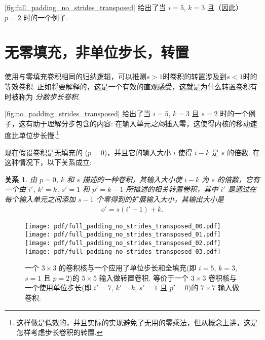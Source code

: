 \documentclass[notitlepage]{ctexrep}
\newtheorem{relationship}{关系}
\begin{document}
\autoref{fig:full_padding_no_strides_transposed} 给出了当 $i =
5$, $k = 3$ 且（因此） $p = 2$ 时的一个例子.

\section{无零填充，非单位步长，转置}

使用与零填充卷积相同的归纳逻辑，可以推测$s>1$时卷积的转置涉及到$s<1$时的等效卷积. 
正如将要解释的，这是一个有效的直观感受，这就是为什么转置卷积有时被称为 {\em
分数步长卷积}.

\autoref{fig:no_padding_strides_transposed} 给出了当 $i = 5$, $k
= 3$ 且 $s = 2$ 时的一个例子，这有助于理解分步包含的内容: 在输入单元{\em 之间\/}插入零，这使得内核的移动速度比单位步长慢.\footnote{这样做是低效的，并且实际的实现避免了无用的零乘法，但从概念上讲，这是怎样考虑步长卷积的转置.}

现在假设卷积是无填充的 ($p = 0$)，并且它的输入大小 $i$ 使得 $i - k$ 是 $s$ 的倍数. 在这种情况下，以下关系成立:

\begin{relationship}\label{rel:no_padding_strides_transposed}
由 $p = 0$, $k$ 和 $s$ 描述的一种卷积，其输入大小使 $i - k$ 为 $s$ 的倍数，它有一个由 $\tilde{i}'$, $k' = k$, $s' = 1$ 和 $p' = k - 1$ 所描述的相关转置卷积，其中 $\tilde{i}'$ 是通过在每个输入单元之间添加 $s - 1$ 个零得到的扩展输入大小，其输出大小是
\begin{equation*}
\begin{split}
    o' = s (i' - 1) + k.
\end{split}
\end{equation*}
\end{relationship}

\begin{figure}[p]
    \centering
    \texttt{[image: pdf/full\_padding\_no\_strides\_transposed\_00.pdf]}
    \texttt{[image: pdf/full\_padding\_no\_strides\_transposed\_01.pdf]}
    \texttt{[image: pdf/full\_padding\_no\_strides\_transposed\_02.pdf]}
    \texttt{[image: pdf/full\_padding\_no\_strides\_transposed\_03.pdf]}
    \caption{\label{fig:full_padding_no_strides_transposed} 
    一个 $3 \times 3$ 的卷积核与一个应用了单位步长和全填充(即 $i = 5$, $k = 3$, $s = 1$ 且 $p = 2$)的 $5 \times 5$ 输入做转置卷积. 等价于一个 $3 \times 3$ 卷积核与一个使用单位步长(即 $i' = 7$, $k' = k$, $s' = 1$ 且 $p' = 0$)的 $7 \times 7$ 输入做卷积.}
\end{figure}
\end{document}
